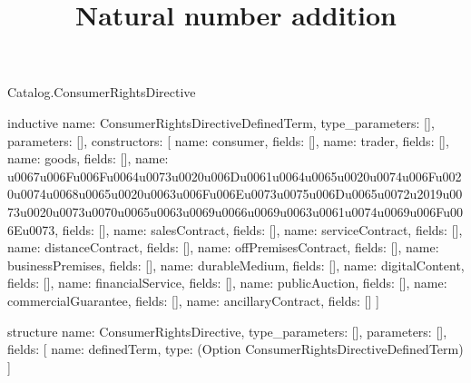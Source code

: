 \begin{lexlean}{Catalog.ConsumerRightsDirective}
\title{Natural number addition}
\begin{semanticmodule}
inductive{
  name: ConsumerRightsDirectiveDefinedTerm,
  type_parameters: [],
  parameters: [],
  constructors: [
    {name: consumer, fields: []},
    {name: trader, fields: []},
    {name: goods, fields: []},
    {name: u0067u006Fu006Fu0064u0073u0020u006Du0061u0064u0065u0020u0074u006Fu0020u0074u0068u0065u0020u0063u006Fu006Eu0073u0075u006Du0065u0072u2019u0073u0020u0073u0070u0065u0063u0069u0066u0069u0063u0061u0074u0069u006Fu006Eu0073, fields: []},
    {name: salesContract, fields: []},
    {name: serviceContract, fields: []},
    {name: distanceContract, fields: []},
    {name: offPremisesContract, fields: []},
    {name: businessPremises, fields: []},
    {name: durableMedium, fields: []},
    {name: digitalContent, fields: []},
    {name: financialService, fields: []},
    {name: publicAuction, fields: []},
    {name: commercialGuarantee, fields: []},
    {name: ancillaryContract, fields: []}
  ]
}

structure{
  name: ConsumerRightsDirective,
  type_parameters: [],
  parameters: [],
  fields: [
    {name: definedTerm, type: (Option ConsumerRightsDirectiveDefinedTerm)}
  ]
}
\end{semanticmodule}
\end{lexlean}

